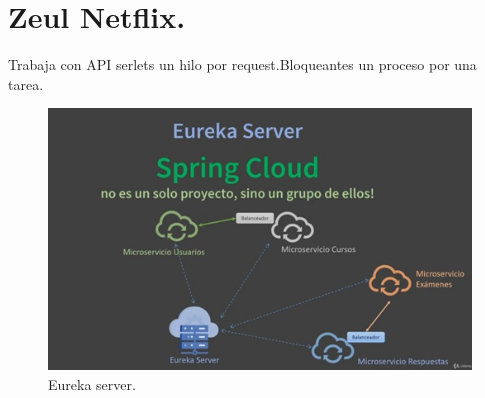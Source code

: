 \section{Zeul  Netflix.}
Trabaja con API serlets un hilo por request.Bloqueantes un proceso por una tarea.
\begin{figure}[H] 
	\centering
	\includegraphics[scale=0.7]{images/c2_1.jpg}
	\caption{Eureka server.}
\end{figure}
